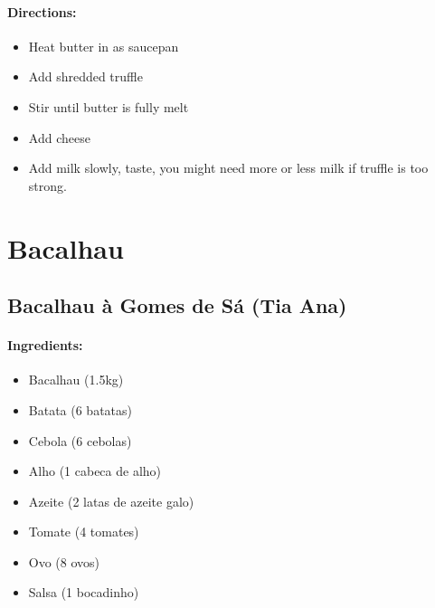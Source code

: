 \documentclass{article}
\begin{document}
\paragraph{Directions:}
\begin{itemize}
	\item Heat butter in as saucepan
	\item Add shredded truffle
	\item Stir until butter is fully melt
	\item Add cheese
	\item Add milk slowly, taste, you might need more or less milk if truffle is too strong.
\end{itemize}

\section{Bacalhau}

\subsection{Bacalhau à Gomes de Sá (Tia Ana)}

\paragraph{Ingredients:}

\begin{itemize}
	\item Bacalhau (1.5kg)
	\item Batata (6 batatas)
	\item Cebola (6 cebolas)
	\item Alho (1 cabeca de alho)
	\item Azeite (2 latas de azeite galo)
	\item Tomate (4 tomates)
	\item Ovo (8 ovos)
	\item Salsa (1 bocadinho)
\end{itemize}
\end{document}
